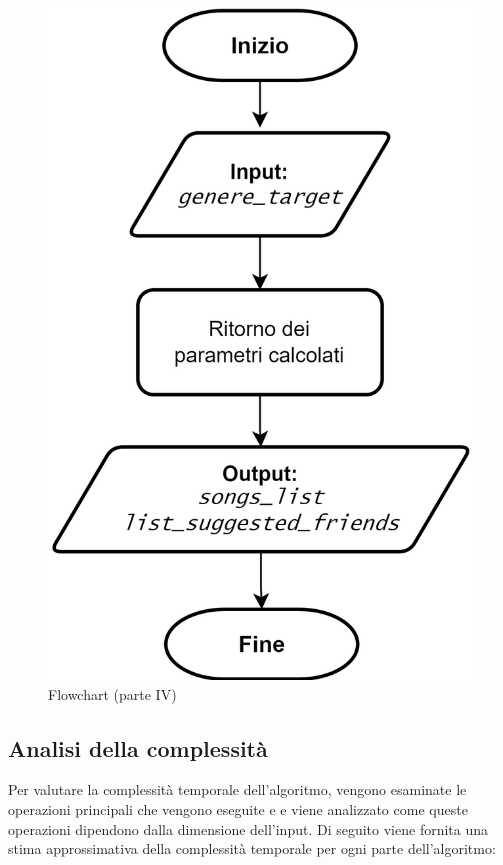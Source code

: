 \begin{figure} [H]
    \centering
    \includegraphics[scale=0.7]{images/flowchart-Parte IV.png}
    \caption{Flowchart (parte IV)}
    \label{fig-fc4}
\end{figure}




\newpage
\subsection{Analisi della complessità}
Per valutare la complessità temporale dell'algoritmo, vengono esaminate le operazioni principali che 
vengono eseguite e e viene analizzato come queste operazioni dipendono dalla dimensione dell'input. 
Di seguito viene fornita una stima approssimativa della complessità temporale per ogni parte dell'algoritmo:


